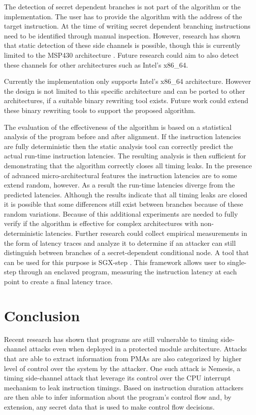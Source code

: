 The detection of secret dependent branches is not part of the algorithm or the implementation. 
The user has to provide the algorithm with the address of the target instruction. 
At the time of writing secret dependent branching instructions need to be identified through manual inspection. 
However, research has shown that static detection of these side channels is possible, though 
this is currently limited to the MSP430 architecture \cite{MSP430Detection}. Future research could aim to also detect these channels for other architectures such as Intel's x86\_64.

Currently the implementation only supports Intel's x86\_64 architecture. 
However the design is not limited to this specific architecture and can be ported to other architectures, if a suitable binary rewriting tool exists. 
Future work could extend these binary rewriting tools to support the proposed algorithm. 

The evaluation of the effectiveness of the algorithm is based on a statistical analysis of the program before and after alignment. 
If the instruction latencies are fully deterministic then the static analysis tool can correctly predict the actual run-time instruction latencies. The resulting analysis 
is then sufficient for demonstrating that the algorithm correctly closes all timing leaks. 
In the presence of advanced micro-architectural features the instruction latencies are to some extend random, however. 
As a result the run-time latencies diverge from the predicted latencies. 
Although the results indicate that all timing leaks are closed it is possible that some differences still exist between branches because of these random variations. 
Because of this additional experiments are needed to fully verify if the algorithm is effective for complex architectures with non-deterministic latencies.
Further research could collect empirical measurements in the form of latency traces and analyze it to determine if an attacker can still distinguish between branches of a secret-dependent conditional node. 
A tool that can be used for this purpose is SGX-step \cite{sgx-step}. 
This framework allows user to single-step through an enclaved program, measuring the instruction latency at each point to create a final latency trace. 

\section{Conclusion}
Recent research has shown that programs are still vulnerable to timing side-channel attacks even when deployed in a protected module architecture. 
Attacks that are able to extract information from PMAs are also categorized by higher level of control over the system by the attacker. 
One such attack is Nemesis, a timing side-channel attack that leverage its control over the CPU interrupt mechanism to leak instruction timings. 
Based on instruction duration attackers are then able to infer information about the program's control flow and, by extension, any secret data that is used to make control flow decisions. 


